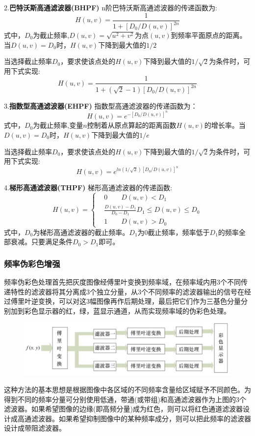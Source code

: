 \documentclass[11pt]{article}
\begin{document}
2.\textbf{巴特沃斯高通滤波器(BHPF)}
n阶巴特沃斯高通滤波器的传递函数为:
$$H(u,v) = \frac{1}{1+[D_0/D(u,v)]^{2n}}$$
式中，$D_0$为截止频率,$D(u,v)=\sqrt{u^2+v^2}$为点$(u,v)$到频率平面原点的距离。当$D(u,v)=D_0$时，$H(u,v)$下降到最大值的$1/2$

当选择截止频率$D_0$，要求使该点处的$H(u,v)$下降到最大值的$1/\sqrt{2}$为条件时，可用下式实现:
$$H(u,v) = \frac{1}{1+(\sqrt{2}-1)[D_0/D(u,v)]^{2n}}$$

3.\textbf{指数型高通滤波器(EHPF)}
指数型高通滤波器的传递函数为：
$$H(u,v) = e^{-[D_0/D(u,v)]^n}$$
式中，$D_0$为截止频率,变量$n$控制着从原点算起的距离函数$H(u,v)$的增长率。当$D(u,v)=D_0$时，$H(u,v)$下降到最大值的$1/e$

当选择截止频率$D_0$，要求使该点处的$H(u,v)$下降到最大值的$1/\sqrt{2}$为条件时，可用下式实现:
$$H(u,v) = e^{ln(1/\sqrt{2})[D_0/D(u,v)]^n}$$

4.\textbf{梯形高通滤波器(THPF)}
梯形高通滤波器的传递函数:
$$H(u,v) = \left\{\begin{matrix}
	&0 \qquad D(u,v)< D_1\\ 
	&\frac{D(u,v)-D_1}{D_0-D_1} D_1\leq D(u,v)\leq D_0 \\
	&1 \qquad D(u,v)> D_0
\end{matrix}\right.$$
式中，$D_0$为梯形高通滤波器的截止频率。$D_1$为0截止频率，频率低于$D_1$的频率全部衰减。只要满足条件$D_0>D_1$即可。

\subsubsection{频率伪彩色增强}
频率伪彩色处理首先把灰度图像经傅里叶变换到频率域，在频率域内用3个不同传递特性的滤波器将其分离成3个独立分量，从3个不同频率的滤波器输出的信号在经过傅里叶逆变换，可以对这3幅图像再作后期处理，最后把它们作为三基色分量分别加到彩色显示器的红，绿，蓝显示通道，从而实现频率域的伪彩色处理。

\begin{figure}[H]
	\centering
	\includegraphics[scale=0.5]{35}
\end{figure}

这种方法的基本思想是根据图像中各区域的不同频率含量给区域赋予不同颜色。为得到不同的频率分量可分别使用低通，带通(或带组)和高通滤波器作为上图的3个滤波器。如果希望图像的边缘(即高频分量)成为红色，则可以将红色通道滤波器设计成高通滤波器。如果希望抑制图像中的某种频率成分，则可以把此频率的滤波器设计成带阻滤波器。
\end{document}
